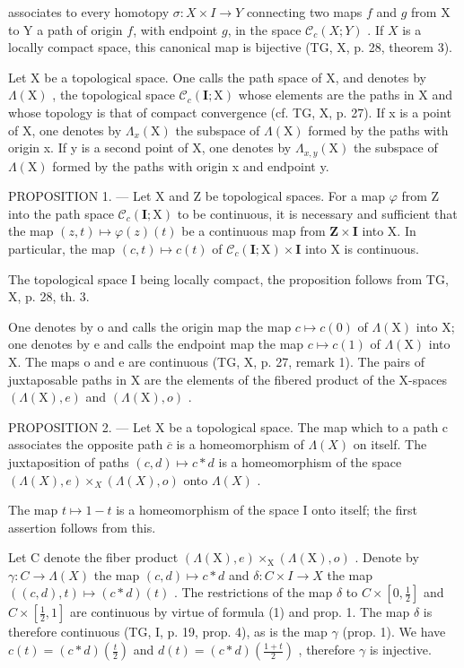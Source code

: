 associates to every homotopy \(\sigma\colon X \times I \to Y\) connecting two maps \(f\) and \(g\) from X to Y a path of origin \(f\), with endpoint \(g\), in the space \(\mathcal{C}_c(X;Y)\) . If \(X\) is a locally compact space, this canonical map is bijective (TG, X, p. 28, theorem 3).

Let X be a topological space. One calls the path space of X, and denotes by \(\Lambda(\mathrm{X})\) , the topological space \(\mathcal{C}_{c}(\mathbf{I};\mathrm{X})\) whose elements are the paths in X and whose topology is that of compact convergence (cf. TG, X, p. 27). If x is a point of X, one denotes by \(\Lambda_{x}(\mathrm{X})\) the subspace of \(\Lambda(\mathrm{X})\) formed by the paths with origin x. If y is a second point of X, one denotes by \(\Lambda_{x,y}(\mathrm{X})\) the subspace of \(\Lambda(\mathrm{X})\) formed by the paths with origin x and endpoint y.

PROPOSITION 1. --- Let X and Z be topological spaces. For a map \(\varphi\) from Z into the path space \(\mathcal{C}_c(\mathbf{I};\mathrm{X})\) to be continuous, it is necessary and sufficient that the map \((z,t)\mapsto \varphi (z)(t)\) be a continuous map from \(\mathbf{Z}\times \mathbf{I}\) into X. In particular, the map \((c,t)\mapsto c(t)\) of \(\mathcal{C}_c(\mathbf{I};\mathrm{X})\times \mathbf{I}\) into X is continuous.

The topological space I being locally compact, the proposition follows from TG, X, p. 28, th. 3.

One denotes by o and calls the origin map the map \(c \mapsto c(0)\) of \(\Lambda(\mathrm{X})\) into X; one denotes by e and calls the endpoint map the map \(c \mapsto c(1)\) of \(\Lambda(\mathrm{X})\) into X. The maps o and e are continuous (TG, X, p. 27, remark 1). The pairs of juxtaposable paths in X are the elements of the fibered product of the X-spaces \((\Lambda(\mathrm{X}), e)\) and \((\Lambda(\mathrm{X}), o)\) .

PROPOSITION 2. --- Let X be a topological space. The map which to a path c associates the opposite path \(\overline{c}\) is a homeomorphism of \(\Lambda(X)\) on itself. The juxtaposition of paths \((c,d)\mapsto c*d\) is a homeomorphism of the space \((\Lambda(X),e)\times_{X}(\Lambda(X),o)\) onto \(\Lambda(X)\) .

The map \(t \mapsto 1 - t\) is a homeomorphism of the space I onto itself; the first assertion follows from this.

Let C denote the fiber product \((\Lambda(\mathrm{X}),e)\times_{\mathrm{X}}(\Lambda(\mathrm{X}),o)\) . Denote by \(\gamma:C\to\Lambda(X)\) the map \((c,d)\mapsto c*d\) and \(\delta:C\times I\to X\) the map \(((c,d),t)\mapsto(c*d)(t)\) . The restrictions of the map \(\delta\) to \(C\times[0,\frac{1}{2}]\) and \(C\times[\frac{1}{2},1]\) are continuous by virtue of formula (1) and prop. 1. The map \(\delta\) is therefore continuous (TG, I, p. 19, prop. 4), as is the map \(\gamma\) (prop. 1). We have \(c(t)=(c*d)(\frac{t}{2})\) and \(d(t)=(c*d)(\frac{1+t}{2})\) , therefore \(\gamma\) is injective.

